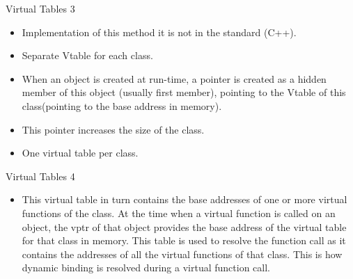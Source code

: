 \begin{frame}{Virtual Tables 3} 
    \begin{itemize}
        \item Implementation of this method it is not in the standard (C++). 
        \item Separate Vtable for each class.
        \item When an object is created at run-time, a pointer is created as a hidden member of this object (usually first member), 
            pointing to the Vtable of this class(pointing to the base address in memory).
        \item This pointer increases the size of the class.
        \item One virtual table per class.
    \end{itemize}
\end{frame}

\begin{frame}{Virtual Tables 4} 
    \begin{itemize}
        \item This virtual table in turn contains the base addresses of one or more virtual functions of the class. At the time when a virtual function is 
            called on an object, the vptr of that object provides the base address of the virtual table for that class in memory. This table is used to resolve 
            the function call as it contains the addresses of all the virtual functions of that class. This is how dynamic binding is resolved during a virtual 
            function call.
    \end{itemize}
\end{frame}


